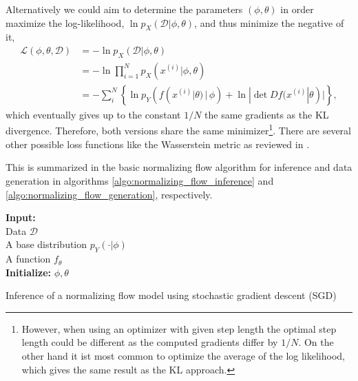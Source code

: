 \documentclass[12pt,a4paper]{article}
\begin{document}
 Alternatively we could aim to determine the parameters $(\phi, \theta)$ in order maximize the log-likelihood, $\ln p_X(\mathcal D | \phi, \theta)$, and thus minimize the negative of it, 
\begin{align}
\mathcal L (\phi, \theta,\mathcal D) &= - \ln p_X(\mathcal D| \phi, \theta) \nonumber \\ 
&=  - \ln \prod _{i=1}^N p_X(x^{(i)}| \phi, \theta) \nonumber \\
&= - \sum_i ^N \left\{ \ln p_Y(f(x^{(i)} | \theta)\, |\, \phi) + \ln |\det Df(x^{(i)}|\theta)|  \right\},
\label{eq:nf_mll}
\end{align} 
which eventually gives up to the constant $1/N$ the same  gradients as the KL divergence. Therefore, both versions share the same minimizer\footnote{However, when using an optimizer with given step length the optimal step length could be different as the computed gradients differ by $1/N$. 
On the other hand it ist most common to optimize the average of the log likelihood, which gives the same result as the KL approach.}.
There are several other possible loss functions like the Wasserstein metric as reviewed in \cite{normalizing_flows_2019}. 

This is summarized in the basic normalizing flow algorithm for inference and data generation in algorithms \ref{algo:normalizing_flow_inference} and  \ref{algo:normalizing_flow_generation}, respectively. 

\begin{algorithm}[t] \label{algo:normalizing_flow_inference}
\SetAlgoLined
\textbf{Input:} \\ 
\quad Data $\mathcal D $ \\
\quad A base distribution $p_Y(\cdot|\phi)$ \\
\quad A function $f_\theta$ \\
\textbf{Initialize:} $\phi, \theta$ \\
\caption{Inference of a normalizing flow model using stochastic gradient descent (SGD)}
\end{algorithm} 
\end{document}
